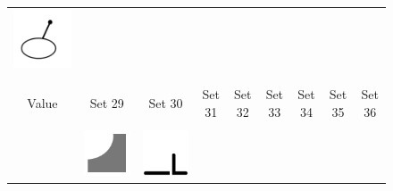 \documentclass[doc]{apa6}
\newcommand{\stimulusscale}{.1}
\begin{document}
\begin{figure}[t]
\begin{center}
\begin{tabular}{c|cccccccc}
\includegraphics[scale=\stimulusscale]{./set28stim75.png} \\
\multicolumn{1}{c}{}\\
\multicolumn{1}{c}{}\\
Value & Set 29 & Set 30 & Set 31 & Set 32 & Set 33 & Set 34 & Set 35 & Set 36 \\[6pt] \hline
\\
 \raisebox{.75cm}{55}  &
\includegraphics[scale=\stimulusscale]{./set29stim55.png} &
\includegraphics[scale=\stimulusscale]{./set30stim55.png} &

\end{tabular}
\end{center}
\end{figure}
\end{document}
